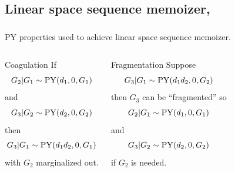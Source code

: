 \documentclass[16pt]{beamer}
\begin{document}



\subsection{Linear space sequence memoizer, \citet{Wood2009}}
\begin{frame}[t] \frametitle{}
PY properties used to achieve linear space sequence memoizer.
\begin{columns}[c]  
\begin{block}{Coagulation \cite{Pitman1999, Ho2006}}
If \[G_2| G_1\sim\py(d_1,0,G_1)\] and \[G_3| G_2\sim\py(d_2,0,G_2)\] then
\[G_3|G_1\sim\py(d_1d_2,0,G_1)\] with $G_2$ marginalized out.
\label{thm:coag}
\end{block}
\begin{block}{Fragmentation \cite{Pitman1999, Ho2006,Wood2009}}
Suppose
 \[G_3| G_1\sim\py(d_1d_2,0,G_2)\]
 then $G_3$
 can be ``fragmented'' so 
 \[G_2 | G_1 \sim \py(d_1,0,G_1)\]
 and
  \[G_3| G_2\sim\py(d_2,0,G_2)\] 
  if $G_2$ is needed.
\end{block}
 \end{columns}
 \end{frame}
\end{document}
